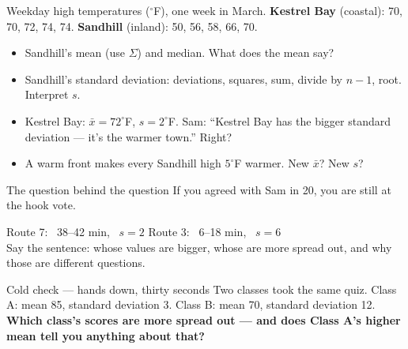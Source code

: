 \documentclass[aspectratio=169, 11pt]{beamer}
\begin{document}
\begin{frame}[t, plain]
  Weekday high temperatures ($^\circ$F), one week in March. \quad
  \textbf{Kestrel Bay} (coastal): 70, 70, 72, 74, 74. \quad
  \textbf{Sandhill} (inland): 50, 56, 58, 66, 70.
  \begin{itemize}\setlength{\itemsep}{4pt}
    \item[18.] Sandhill's mean (use $\Sigma$) and median. What does the mean say?
    \item[19.] Sandhill's standard deviation: deviations, squares, sum, divide by $n - 1$, root.
          Interpret $s$.
    \item[20.] Kestrel Bay: $\bar{x} = 72^\circ$F, $s = 2^\circ$F. Sam: ``Kestrel Bay has the
          bigger standard deviation --- it's the warmer town.'' Right?
    \item[21.] A warm front makes every Sandhill high $5^\circ$F warmer. New $\bar{x}$? New $s$?
  \end{itemize}
  \begin{block}{The question behind the question}
    If you agreed with Sam in 20, you are still at the hook vote.
  \end{block}
\end{frame}

\begin{frame}[t, plain]
  \vspace{4pt}
  \begin{center}
    {\large Route 7: \ 38--42 min, \ $s = 2$ \qquad Route 3: \ 6--18 min, \ $s = 6$}\\[6pt]
    {\small Say the sentence: whose values are bigger, whose are more spread out, and why those
    are different questions.}
  \end{center}
  \vspace{8pt}
  \begin{block}{Cold check --- hands down, thirty seconds}
    Two classes took the same quiz. Class A: mean 85, standard deviation 3. Class B: mean 70,
    standard deviation 12. \textbf{Which class's scores are more spread out --- and does Class
    A's higher mean tell you anything about that?}
  \end{block}
\end{frame}
\end{document}
